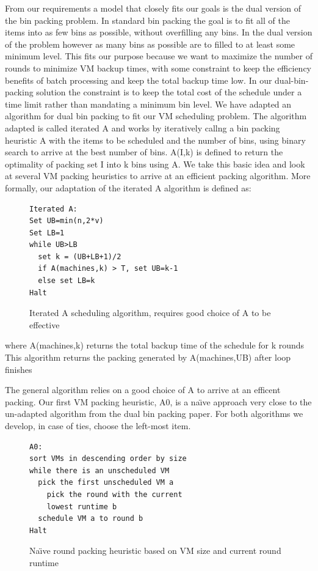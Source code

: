 From our requirements a model that closely fits our goals is the dual version
of the
bin packing problem. In standard bin packing the goal is to fit all of the
items into as few bins as possible, without overfilling any bins. In the dual
version of the problem however as many bins as possible are to filled to at
least some minimum level. This fits our purpose because we want to maximize the
number of rounds to minimize VM backup times, with some constraint to keep the
efficiency benefits of batch processing and keep the total backup time low.
In our dual-bin-packing solution the constraint is to keep the total
cost of the schedule under a time limit rather than mandating a minimum bin
level. We have adapted
an algorithm for dual bin packing\cite{DualBinPacking} to fit our VM
scheduling problem. The algorithm adapted is called iterated A and works by
iteratively callng a bin packing heuristic A with the items to be scheduled and
the number of bins, using binary search to arrive at the best number of
bins. A(I,k) is defined to return the optimality of packing set I into k bins
using A. We take this basic idea and look at several VM packing heuristics to
arrive at an efficient packing algorithm. More formally, our adaptation of the
iterated A algorithm is defined as:


\begin{figure}
\begin{lstlisting}[frame=single]
Iterated A:
Set UB=min(n,2*v)
Set LB=1
while UB>LB
  set k = (UB+LB+1)/2
  if A(machines,k) > T, set UB=k-1
  else set LB=k
Halt
\end{lstlisting}
\caption{Iterated A scheduling algorithm, requires good choice of A to be effective}
\end{figure}

where A(machines,k) returns the total backup time of the schedule for k rounds\\
This algorithm returns the packing generated by A(machines,UB) after loop finishes

The general algorithm relies on a good choice of A to arrive at an efficent
packing. Our first VM packing heuristic, A0, is a na\"\i{}ve approach very
close to the un-adapted algorithm from the dual bin packing paper. For both
algorithms we develop, in case of ties, choose the left-most item.

\begin{figure}
\begin{lstlisting}[frame=single]
A0:
sort VMs in descending order by size
while there is an unscheduled VM
  pick the first unscheduled VM a
    pick the round with the current
    lowest runtime b
  schedule VM a to round b
Halt
\end{lstlisting}
\caption{Na\"{\i}ve round packing heuristic based on VM size and current round runtime}
\end{figure}

